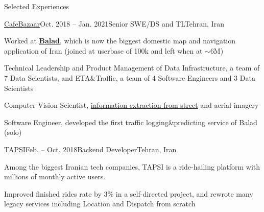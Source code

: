 \begin{xSection}{Selected Experiences}
\begin{tSubsection}{\href{https://cafebazaar.ir/app?l=en}{CafeBazaar}}{Oct. 2018 -- Jan. 2021}{Senior SWE/DS and TL}{Tehran, Iran}
        \item Worked at \textbf{\href{https://balad.ir/about}{Balad}}, which is now the biggest domestic map and navigation application of Iran (joined at userbase of 100k and left when at $\sim$6M)
        \item Technical Leadership and Product Management of Data Infrastructure, a team of 7 Data Scientists, and ETA\&Traffic, a team of 4 Software Engineers and 3 Data Scientists
        \item Computer Vision Scientist, \href{https://medium.com/@MahanFathi/collecting-a-nations-points-of-interest-computer-vision-to-the-rescue-41026053bdf6}{information extraction from street} and aerial imagery
        \item Software Engineer, developed the first traffic logging\&predicting service of Balad (solo)

    \end{tSubsection}



    \begin{tSubsection}{\href{https://tapsi.ir/}{TAPSI}}{Feb. -- Oct. 2018}{Backend Developer}{Tehran, Iran}

        \item Among the biggest Iranian tech companies, TAPSI is a ride-hailing platform with millions of monthly active users.
        \item Improved finished rides rate by 3\% in a self-directed project, and rewrote many legacy services including Location and Dispatch from scratch

    \end{tSubsection}


\end{xSection}
